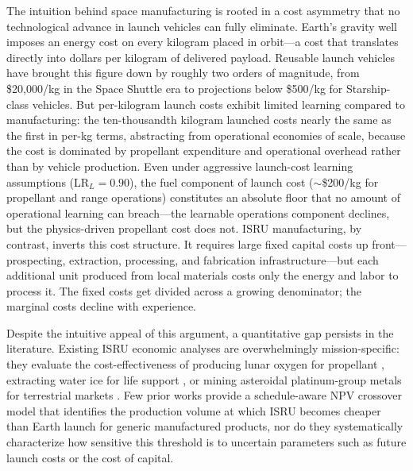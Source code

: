 \documentclass[preprint,12pt]{elsarticle}
\begin{document}
The intuition behind space manufacturing is rooted in a cost asymmetry that no technological advance in launch vehicles can fully eliminate. Earth's gravity well imposes an energy cost on every kilogram placed in orbit---a cost that translates directly into dollars per kilogram of delivered payload. Reusable launch vehicles have brought this figure down by roughly two orders of magnitude, from \$20{,}000/kg in the Space Shuttle era to projections below \$500/kg for Starship-class vehicles. But per-kilogram launch costs exhibit limited learning compared to manufacturing: the ten-thousandth kilogram launched costs nearly the same as the first in per-kg terms, abstracting from operational economies of scale, because the cost is dominated by propellant expenditure and operational overhead rather than by vehicle production. Even under aggressive launch-cost learning assumptions (LR$_L = 0.90$), the fuel component of launch cost ($\sim$\$200/kg for propellant and range operations) constitutes an absolute floor that no amount of operational learning can breach---the learnable operations component declines, but the physics-driven propellant cost does not. ISRU manufacturing, by contrast, inverts this cost structure. It requires large fixed capital costs up front---prospecting, extraction, processing, and fabrication infrastructure---but each additional unit produced from local materials costs only the energy and labor to process it. The fixed costs get divided across a growing denominator; the marginal costs decline with experience.

Despite the intuitive appeal of this argument, a quantitative gap persists in the literature. Existing ISRU economic analyses are overwhelmingly mission-specific: they evaluate the cost-effectiveness of producing lunar oxygen for propellant \cite{sanders2015}, extracting water ice for life support \cite{zubrin1996}, or mining asteroidal platinum-group metals for terrestrial markets \cite{sonter1997,elvis2012}. Few prior works provide a schedule-aware NPV crossover model that identifies the production volume at which ISRU becomes cheaper than Earth launch for generic manufactured products, nor do they systematically characterize how sensitive this threshold is to uncertain parameters such as future launch costs or the cost of capital.
\end{document}
